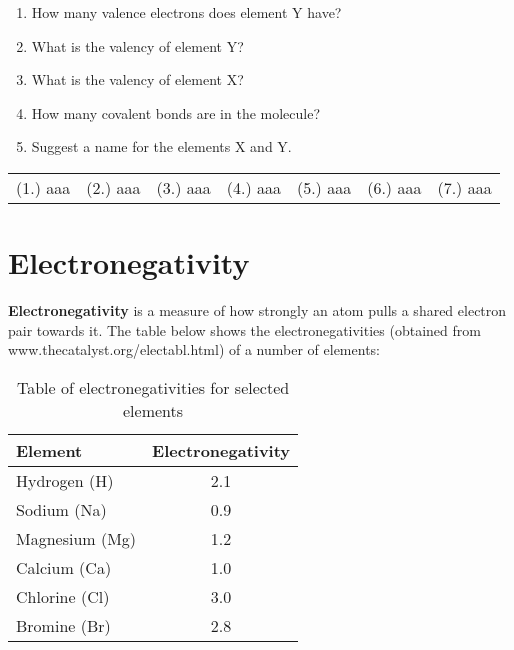 {\begin{enumerate}
{\begin{enumerate}
\item{How many valence electrons does element Y have?}
\item{What is the valency of element Y?}
\item{What is the valency of element X?}
\item{How many covalent bonds are in the molecule?}
\item{Suggest a name for the elements X and Y.}
\end{enumerate}
}

\end{enumerate}
\practiceinfo

\begin{tabular}[h]{cccccc}
(1.) aaa & (2.) aaa & (3.) aaa & (4.) aaa & (5.) aaa & (6.) aaa & (7.) aaa & 
 \end{tabular}
}







\section{Electronegativity}

\textbf{Electronegativity} is a measure of how strongly an atom pulls a shared electron pair towards it. The table below shows the electronegativities (obtained from www.thecatalyst.org/electabl.html) of a number of elements:

\begin{table}[!h]
\begin{center}
\caption{Table of electronegativities for selected elements}
\begin{tabular}{|l|c|}\hline
\textbf{Element} & \textbf{Electronegativity}\\\hline
Hydrogen (H) & 2.1\\\hline
Sodium (Na) & 0.9\\\hline
Magnesium (Mg) & 1.2\\\hline
Calcium (Ca) & 1.0\\\hline
Chlorine (Cl) & 3.0\\\hline
Bromine (Br) & 2.8\\\hline
\end{tabular}
\end{center}
\end{table}


